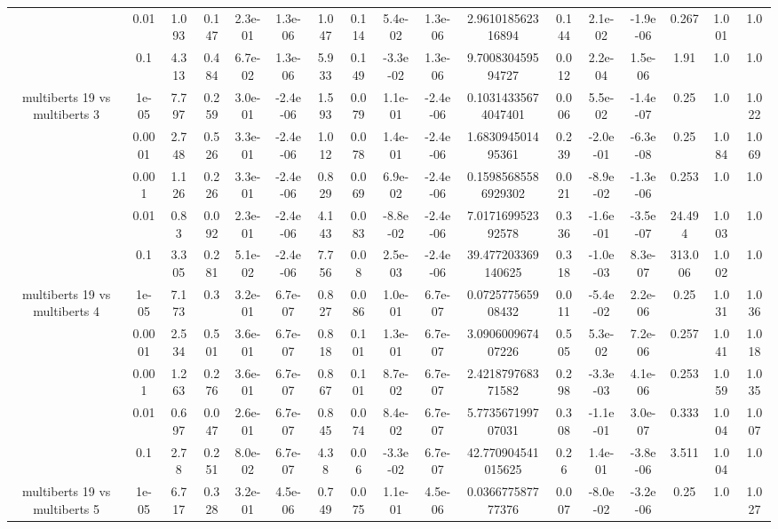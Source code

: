 \begin{tabular}{|c|c|c|c|c|c|c|c|c|c|c|c|c|c|c|c|c|}
 & 0.01 & 1.093 & 0.147 & 2.3e-01 & 1.3e-06 & 1.047 & 0.114 & 5.4e-02 & 1.3e-06 & 2.961018562316894 & 0.144 & 2.1e-02 & -1.9e-06 & 0.267 & 1.001 & 1.0 \\
 & 0.1 & 4.313 & 0.484 & 6.7e-02 & 1.3e-06 & 5.933 & 0.149 & -3.3e-02 & 1.3e-06 & 9.700830459594727 & 0.012 & 2.2e-04 & 1.5e-06 & 1.91 & 1.0 & 1.0 \\
\hline
\multirow{5}{*}{multiberts 19 vs multiberts 3} & 1e-05 & 7.797 & 0.259 & 3.0e-01 & -2.4e-06 & 1.593 & 0.079 & 1.1e-01 & -2.4e-06 & 0.10314335674047401 & 0.006 & 5.5e-02 & -1.4e-07 & 0.25 & 1.0 & 1.022 \\
 & 0.0001 & 2.748 & 0.526 & 3.3e-01 & -2.4e-06 & 1.012 & 0.078 & 1.4e-01 & -2.4e-06 & 1.683094501495361 & 0.239 & -2.0e-01 & -6.3e-08 & 0.25 & 1.084 & 1.069 \\
 & 0.001 & 1.126 & 0.226 & 3.3e-01 & -2.4e-06 & 0.829 & 0.069 & 6.9e-02 & -2.4e-06 & 0.15985685586929302 & 0.021 & -8.9e-02 & -1.3e-06 & 0.253 & 1.0 & 1.0 \\
 & 0.01 & 0.83 & 0.092 & 2.3e-01 & -2.4e-06 & 4.143 & 0.083 & -8.8e-02 & -2.4e-06 & 7.017169952392578 & 0.336 & -1.6e-01 & -3.5e-07 & 24.494 & 1.003 & 1.0 \\
 & 0.1 & 3.305 & 0.281 & 5.1e-02 & -2.4e-06 & 7.756 & 0.08 & 2.5e-03 & -2.4e-06 & 39.477203369140625 & 0.318 & -1.0e-03 & 8.3e-07 & 313.006 & 1.002 & 1.0 \\
\hline
\multirow{5}{*}{multiberts 19 vs multiberts 4} & 1e-05 & 7.173 & 0.3 & 3.2e-01 & 6.7e-07 & 0.827 & 0.086 & 1.0e-01 & 6.7e-07 & 0.072577565908432 & 0.011 & -5.4e-02 & 2.2e-06 & 0.25 & 1.031 & 1.036 \\
 & 0.0001 & 2.534 & 0.501 & 3.6e-01 & 6.7e-07 & 0.818 & 0.101 & 1.3e-01 & 6.7e-07 & 3.090600967407226 & 0.505 & 5.3e-02 & 7.2e-06 & 0.257 & 1.041 & 1.018 \\
 & 0.001 & 1.263 & 0.276 & 3.6e-01 & 6.7e-07 & 0.867 & 0.101 & 8.7e-02 & 6.7e-07 & 2.421879768371582 & 0.298 & -3.3e-03 & 4.1e-06 & 0.253 & 1.059 & 1.035 \\
 & 0.01 & 0.697 & 0.047 & 2.6e-01 & 6.7e-07 & 0.845 & 0.074 & 8.4e-02 & 6.7e-07 & 5.773567199707031 & 0.308 & -1.1e-01 & 3.0e-07 & 0.333 & 1.004 & 1.007 \\
 & 0.1 & 2.78 & 0.251 & 8.0e-02 & 6.7e-07 & 4.38 & 0.06 & -3.3e-02 & 6.7e-07 & 42.770904541015625 & 0.26 & 1.4e-01 & -3.8e-06 & 3.511 & 1.004 & 1.0 \\
\hline
\multirow{5}{*}{multiberts 19 vs multiberts 5} & 1e-05 & 6.717 & 0.328 & 3.2e-01 & 4.5e-06 & 0.749 & 0.075 & 1.1e-01 & 4.5e-06 & 0.036677587777376 & 0.007 & -8.0e-02 & -3.2e-06 & 0.25 & 1.0 & 1.027 \\

\end{tabular}
